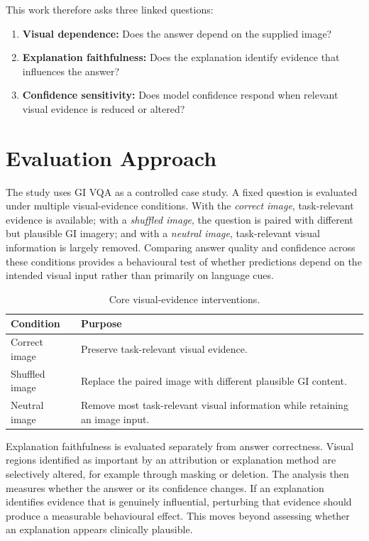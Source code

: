 \documentclass[letterpaper]{article}
\begin{document}
This work therefore asks three linked questions:
\begin{enumerate}
    \item \textbf{Visual dependence:} Does the answer depend on the supplied image?
    \item \textbf{Explanation faithfulness:} Does the explanation identify evidence that influences the answer?
    \item \textbf{Confidence sensitivity:} Does model confidence respond when relevant visual evidence is reduced or altered?
\end{enumerate}

\section{Evaluation Approach}

The study uses GI VQA as a controlled case study. A fixed question is evaluated under multiple visual-evidence conditions. With the \emph{correct image}, task-relevant evidence is available; with a \emph{shuffled image}, the question is paired with different but plausible GI imagery; and with a \emph{neutral image}, task-relevant visual information is largely removed. Comparing answer quality and confidence across these conditions provides a behavioural test of whether predictions depend on the intended visual input rather than primarily on language cues.

\begin{table}[t]
\centering
\small
\caption{Core visual-evidence interventions.}
\label{tab:conditions}
\begin{tabular}{p{} p{}}
\toprule
\textbf{Condition} & \textbf{Purpose} \\
\midrule
Correct image & Preserve task-relevant visual evidence. \\
Shuffled image & Replace the paired image with different plausible GI content. \\
Neutral image & Remove most task-relevant visual information while retaining an image input. \\
\bottomrule
\end{tabular}
\end{table}

Explanation faithfulness is evaluated separately from answer correctness. Visual regions identified as important by an attribution or explanation method are selectively altered, for example through masking or deletion. The analysis then measures whether the answer or its confidence changes. If an explanation identifies evidence that is genuinely influential, perturbing that evidence should produce a measurable behavioural effect. This moves beyond assessing whether an explanation appears clinically plausible.
\end{document}
